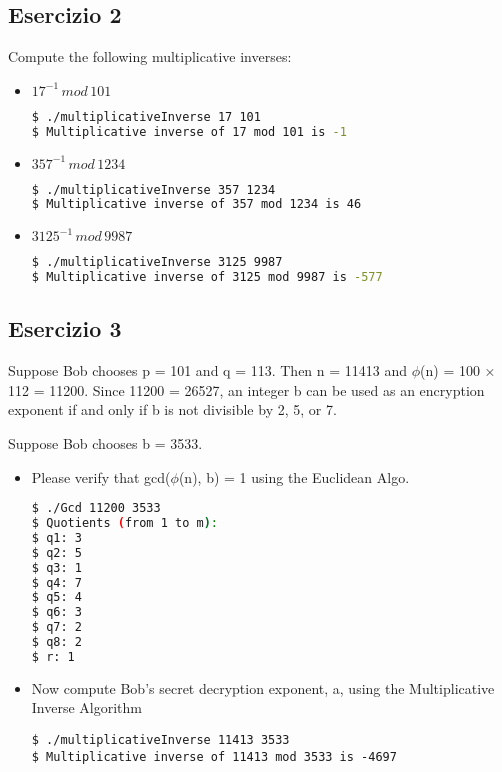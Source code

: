 \documentclass{article}
\begin{document}
\subsection{Esercizio 2}
Compute the following multiplicative inverses: 
\begin{itemize}
    \item \(17^{-1} \, mod \, 101\)
    \begin{lstlisting}[language=bash]
$ ./multiplicativeInverse 17 101                      
$ Multiplicative inverse of 17 mod 101 is -1
    \end{lstlisting}                       

    \item \(357^{-1} \, mod \, 1234\)
    \begin{lstlisting}[language=bash]
$ ./multiplicativeInverse 357 1234              
$ Multiplicative inverse of 357 mod 1234 is 46
    \end{lstlisting}
    \item \(3125^{-1} \, mod \, 9987\)
    \begin{lstlisting}[language=bash]
$ ./multiplicativeInverse 3125 9987
$ Multiplicative inverse of 3125 mod 9987 is -577
    \end{lstlisting}
\end{itemize}

\subsection{Esercizio 3}
Suppose Bob chooses p = 101 and q = 113. Then n = 11413 and \(\phi\)(n) = 100 × 112 = 11200. Since 11200 = 26527, an integer b can be used as an encryption exponent if and only if b is not divisible by 2, 5, or 7.

Suppose Bob chooses b = 3533.
\begin{itemize}
    \item  Please verify that gcd(\(\phi\)(n), b) = 1 using the Euclidean Algo.
    \begin{lstlisting}[language=bash]
$ ./Gcd 11200 3533
$ Quotients (from 1 to m):
$ q1: 3
$ q2: 5
$ q3: 1
$ q4: 7
$ q5: 4
$ q6: 3
$ q7: 2
$ q8: 2
$ r: 1
    \end{lstlisting}
    \item Now compute Bob’s secret decryption exponent, a, using the Multiplicative Inverse Algorithm 
        \begin{lstlisting}
$ ./multiplicativeInverse 11413 3533
$ Multiplicative inverse of 11413 mod 3533 is -4697
        \end{lstlisting}    

\end{itemize}
\end{document}
